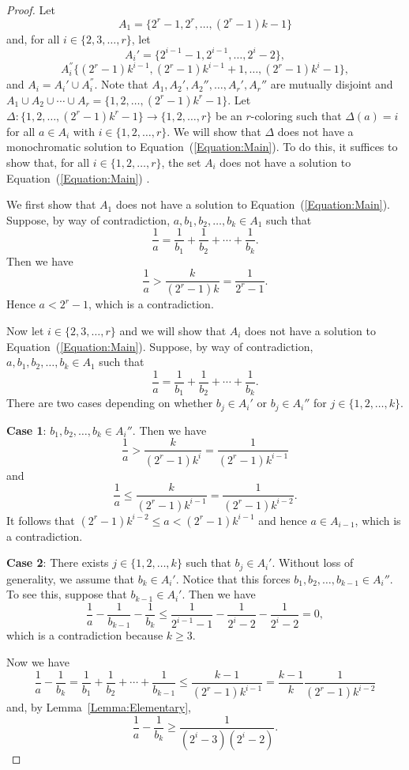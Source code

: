 \documentclass[10pt,a4paper]{amsart}
\begin{document}
\begin{proof}
    Let 
    \[
    A_1=\{2^r-1,2^r,\ldots,(2^r-1)k-1\}
    \]
    and, for all $i\in\{2,3,\ldots,r\}$, let
    \[
    A_i'=\{2^{i-1}-1,2^{i-1},\ldots,2^i-2\},
    \]
    \[
    A_i^{''}\{(2^r-1)k^{i-1}, (2^r-1)k^{i-1}+1,\ldots,(2^r-1)k^i-1\},
    \]
    and $A_i=A_i'\cup A_i^{''}$. Note that $A_1,A_2',A_2'',\ldots,A_r',A_r''$ are mutually disjoint and $A_1\cup A_2\cup\cdots\cup A_r=\{1,2,\ldots,(2^r-1)k^r-1\}$. Let $\Delta:\{1,2,\ldots,(2^r-1)k^r-1\}\to\{1,2,\ldots,r\}$ be an $r$-coloring such that $\Delta(a)=i$ for all $a\in A_i$ with $i\in\{1,2,\ldots,r\}$. We will show that $\Delta$ does not have a monochromatic solution to Equation~(\ref{Equation:Main}). To do this, it suffices to show that, for all $i\in\{1,2,\ldots,r\}$, the set $A_i$ does not have a solution to Equation~(\ref{Equation:Main}) .

    We first show that $A_1$ does not have a solution to Equation~(\ref{Equation:Main}). Suppose, by way of contradiction, $a,b_1,b_2,\ldots,b_k\in A_1$ such that
    \[
    \frac{1}{a}=\frac{1}{b_1}+\frac{1}{b_2}+\cdots+\frac{1}{b_k}.
    \]
    Then we have
    \[
    \frac{1}{a}>\frac{k}{(2^r-1)k}=\frac{1}{2^r-1}.
    \]
    Hence $a<2^r-1$, which is a contradiction.

    Now let $i\in\{2,3,\ldots,r\}$ and we will show that $A_i$ does not have a solution to Equation~(\ref{Equation:Main}). Suppose, by way of contradiction, $a,b_1,b_2,\ldots,b_k\in A_1$ such that
    \[
    \frac{1}{a}=\frac{1}{b_1}+\frac{1}{b_2}+\cdots+\frac{1}{b_k}.
    \]
    There are two cases depending on whether $b_j\in A_i'$ or $b_j\in A_i''$ for $j\in\{1,2,\ldots,k\}$.

   {\bf Case 1}: $b_1,b_2,\ldots,b_k\in A_i''$. Then we have
    \[
    \frac{1}{a}>\frac{k}{(2^r-1)k^i}=\frac{1}{(2^r-1)k^{i-1}}
    \]
    and
    \[
    \frac{1}{a}\leq\frac{k}{(2^r-1)k^{i-1}}=\frac{1}{(2^r-1)k^{i-2}}.
    \]
    It follows that $(2^r-1)k^{i-2}\leq a<(2^r-1)k^{i-1}$ and hence $a\in A_{i-1}$, which is a contradiction.

    {\bf Case 2}: There exists $j\in\{1,2,\ldots,k\}$ such that $b_j\in A_i'$. Without loss of generality, we assume that $b_k\in A_i'$. Notice that this forces $b_1,b_2,\ldots,b_{k-1}\in A_i''$. To see this, suppose that $b_{k-1}\in A_i'$. Then we have
    \[
    \frac{1}{a}-\frac{1}{b_{k-1}}-\frac{1}{b_k}\leq\frac{1}{2^{i-1}-1}-\frac{1}{2^i-2}-\frac{1}{2^i-2}=0,
    \]
    which is a contradiction because $k\geq3$.

    Now we have
    \[
    \frac{1}{a}-\frac{1}{b_k}=\frac{1}{b_1}+\frac{1}{b_2}+\cdots+\frac{1}{b_{k-1}}\leq\frac{k-1}{(2^r-1)k^{i-1}}=\frac{k-1}{k}\frac{1}{(2^r-1)k^{i-2}}
    \]
    and, by Lemma~\ref{Lemma:Elementary}, 
    \[
    \frac{1}{a}-\frac{1}{b_k}\geq\frac{1}{(2^i-3)(2^i-2)}.
    \]


\end{proof}
\end{document}
